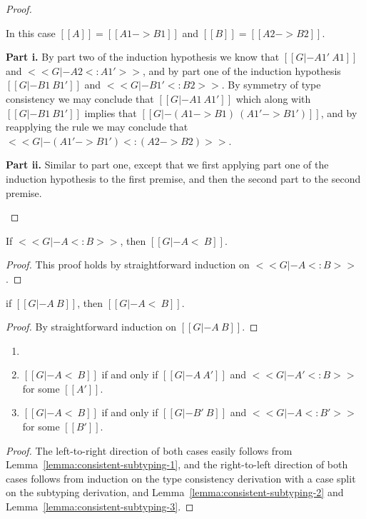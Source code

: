 \begin{proof}
\begin{itemize}
    In this case $[[A]] = [[A1 -> B1]]$ and $[[B]] = [[A2 -> B2]]$.

    \noindent
    \textbf{Part i.} By part two of the induction hypothesis we know
    that $[[G |- A1' ~ A1]]$ and $<<G |- A2 <: A1'>>$, and by part one of the induction hypothesis
    $[[G |- B1 ~ B1']]$ and $<<G |- B1' <: B2>>$.  By symmetry of type consistency
    we may conclude that $[[G |- A1 ~ A1']]$ which along with $[[G |- B1 ~ B1']]$
    implies that $[[G |- (A1 -> B1) ~ (A1' -> B1')]]$, and by reapplying the rule
    we may conclude that $<<G |- (A1' -> B1') <: (A2 -> B2)>>$.

    \noindent
    \textbf{Part ii.} Similar to part one, except that we first
    applying part one of the induction hypothesis to the first
    premise, and then the second part to the second premise.
    
  \end{itemize}

\end{proof}

\begin{lemma}
  \label{lemma:consistent-subtyping-2}
  If $<<G |- A <: B>>$, then $[[G |- A <~ B]]$.
\end{lemma}
\begin{proof}
  This proof holds by straightforward induction on $<<G |- A <: B>>$.
\end{proof}

\begin{lemma}
  \label{lemma:consistent-subtyping-3}
  if $[[G |- A ~ B]]$, then $[[G |- A <~ B]]$.
\end{lemma}
\begin{proof}
  By straightforward induction on $[[G |- A ~ B]]$.
\end{proof}

\begin{corollary}
  \label{corollary:consistent_subtyping}
  \begin{enumerate}[label=\roman*.,align=left]
  \item[]
  \item $[[G |- A <~ B]]$ if and only if $[[G |- A ~ A']]$ and $<<G |- A' <: B>>$ for some $[[A']]$.
  \item $[[G |- A <~ B]]$ if and only if $[[G |- B' ~ B]]$ and $<<G |- A <: B'>>$ for some $[[B']]$.
  \end{enumerate}
\end{corollary}
\begin{proof}
  The left-to-right direction of both cases easily follows from
  Lemma~\ref{lemma:consistent-subtyping-1}, and the right-to-left
  direction of both cases follows from induction on the type
  consistency derivation with a case split on the subtyping derivation,
  and Lemma~\ref{lemma:consistent-subtyping-2} and Lemma~\ref{lemma:consistent-subtyping-3}.
\end{proof}

